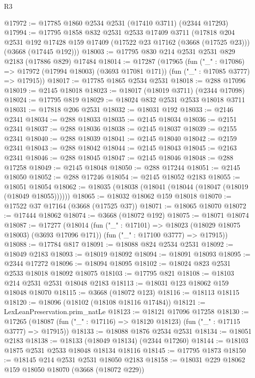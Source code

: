 \begin{lexlean}{R3}
\begin{coremodule}
@17972 := @17785 @1860 @2534 @2531 (@17410 @3711) (@2344 @17293)
@17994 := @17795
    @1858
    @832
    @2531
    @2533
    @17409
    @3711
    (@17818
      @204
      @2531
      @192
      @17428
      @159
      @17409
      (@17522 @23 @17162 (@3668 (@17525 @23)))
      (@3668 (@17445 @192)))
@18003 := @17795 @830 @214 @2531 @2531 @829 @2183 (@17886 @829) @17484
@18014 := @17287
    (@17965
      (fun ("_" : @17086) => @17972 (@17994 @18003) (@3693 @17081 @171))
      (fun ("_" : @17085 @3777) => @17915))
@18017 := @17785 @1865 @2534 @2531
@18018 := @288 @17096
@18019 := @2145 @18018
@18023 := @18017 (@18019 @3711) (@2344 @17098)
@18024 := @17795 @819
@18029 := @18024 @832 @2531 @2533 @18018 @3711
@18031 := @17818 @206 @2531
@18032 := @18031 @192
@18033 := @2146 @2341
@18034 := @288 @18033
@18035 := @2145 @18034
@18036 := @2151 @2341
@18037 := @288 @18036
@18038 := @2145 @18037
@18039 := @2155 @2341
@18040 := @288 @18039
@18041 := @2145 @18040
@18042 := @2159 @2341
@18043 := @288 @18042
@18044 := @2145 @18043
@18045 := @2163 @2341
@18046 := @288 @18045
@18047 := @2145 @18046
@18048 := @288 @17258
@18049 := @2145 @18048
@18050 := @288 @17244
@18051 := @2145 @18050
@18052 := @288 @17246
@18054 := @2145 @18052 @2183
@18055 := @18051 @18054
@18062 := @18035 (@18038 (@18041 (@18044 (@18047 (@18019 (@18049 @18055))))))
@18065 := @18032 @18062 @159 @18018
@18070 := @17522 @37 @17164 (@3668 (@17525 @37))
@18071 := @18065 @18070
@18072 := @17444 @18062
@18074 := @3668 (@18072 @192)
@18075 := @18071 @18074
@18087 := @17277
    (@18014
      (fun ("_" : @17101) => @18023 (@18029 @18075 @18003) (@3693 @17096 @171))
      (fun ("_" : @17100 @3777) => @17915))
@18088 := @17784 @817
@18091 := @18088 @824 @2534 @2531
@18092 := @18049 @2183
@18093 := @18019 @18092
@18094 := @18091 @18093
@18095 := @2344 @17272
@18096 := @18094 @18095
@18102 := @18024 @823 @2531 @2533 @18018 @18092 @18075
@18103 := @17795 @821
@18108 := @18103 @214 @2531 @2531 @18048 @2183
@18113 := @18031 @123 @18062 @159 @18048 @18070
@18115 := @3668 (@18072 @123)
@18116 := @18113 @18115
@18120 := @18096 (@18102 (@18108 @18116 @17484))
@18121 := LexLeanPreservation.prim_natLe
@18123 := @18121 @17096 @17258
@18130 := @17265 (@18087 (fun ("_" : @17116) => @18120 @18123) (fun ("_" : @17115 @3777) => @17915))
@18133 := @18088 @1876 @2534 @2531
@18134 := @18051 @2183
@18138 := @18133 (@18049 @18134) (@2344 @17260)
@18144 := @18103 @1875 @2531 @2533 @18048 @18134 @18116
@18145 := @17795 @1873
@18150 := @18145 @214 @2531 @2531 @18050 @2183
@18158 := @18031 @229 @18062 @159 @18050 @18070 (@3668 (@18072 @229))

\end{coremodule}
\end{lexlean}
